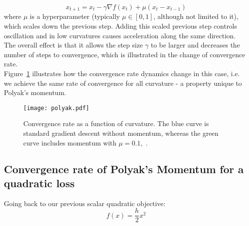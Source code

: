 \documentclass{article}
\begin{document}
\begin{equation}
x_{t+1} = x_t - \gamma \nabla f(x_t) + \mu(x_t-x_{t-1})
\end{equation}
where $\mu$ is a hyperparameter (typically $\mu \in [0,1]$, although not limited to it), which scales down the previous step. Adding this scaled previous step controls oscillation and in low curvatures causes acceleration along the same direction. The overall effect is that it allows the step size $\gamma$ to be larger and decreases the number of steps to convergence, which is illustrated in the change of convergence rate.
\\

Figure~\ref{fig:conv_momentum} illustrates how the convergence rate dynamics change in this case, i.e. we achieve the same rate of convergence for all curvature - a property unique to Polyak's momentum.

\begin{figure}[H]%
\centering%
\texttt{[image: polyak.pdf]}
\caption{Convergence rate as a function of curvature. The blue curve is standard gradient descent without momentum, whereas the green curve includes momentum with $\mu = 0.1$,~\cite{mitliagkas2019interesting}.}
\label{fig:conv_momentum}
\end{figure}

\subsection{Convergence rate of Polyak's Momentum for a quadratic loss}

Going back to our previous scalar quadratic objective:
\begin{equation}
	f(x) = \frac{h}{2} x^2
\end{equation}
\end{document}
